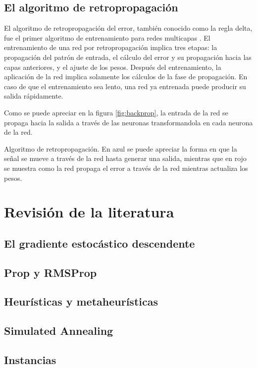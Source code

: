 \subsection{El algoritmo de retropropagación}
El algoritmo de retropropagación del error, también conocido como la regla delta, fue el primer algoritmo de entrenamiento para redes multicapas  \cite{Werbos1974, Rumelhart1986}. El entrenamiento de una red por retropropagación implica tres etapas: la propagación del patrón de entrada, el cálculo del error y su propagación hacia las capas anteriores, y el ajuste de los pesos. Después del entrenamiento, la aplicación de la red implica solamente los cálculos de la fase de propagación. En caso de que el entrenamiento sea lento, una red ya entrenada puede producir su salida rápidamente.

Como se puede apreciar en la figura \ref{fig:backprop}, la entrada de la red se propaga hacia la salida a través de las neuronas transformandola en cada neurona de la red.
\begin{imagen}
	\scalebox{1.0}{}
	\caption[Algoritmo de retropropagación]{Algoritmo de retropropagación. En azul se puede apreciar la forma en que la señal se mueve a través de la red hasta generar una salida, mientras que en rojo se muestra como la red propaga el error a través de la red mientras actualiza los pesos.}
	\label{fig:backprop}
\end{imagen}

\section{Revisión de la literatura}
\subsection{El gradiente estocástico descendente}
\subsection{Prop y RMSProp}
\subsection{Heurísticas y metaheurísticas}
\subsection{Simulated Annealing}
\subsection{Instancias}
